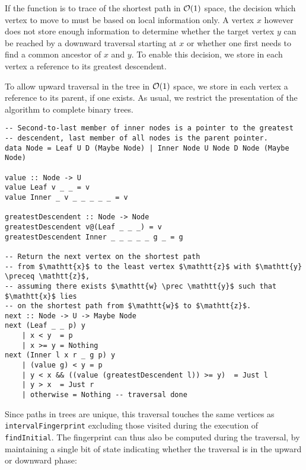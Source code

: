 If the function is to trace of the shortest path in $\mathcal{O}(1)$ space, the decision which vertex to move to must be based on local information only. A vertex $x$ however does not store enough information to determine whether the target vertex $y$ can be reached by a downward traversal starting at $x$ or whether one first needs to find a common ancestor of $x$ and $y$. To enable this decision, we store in each vertex a reference to its greatest descendent.

To allow upward traversal in the tree in $\mathcal{O}(1)$ space, we store in each vertex a reference to its parent, if one exists. As usual, we restrict the presentation of the algorithm to complete binary trees.

\begin{verbatim}
-- Second-to-last member of inner nodes is a pointer to the greatest
-- descendent, last member of all nodes is the parent pointer.
data Node = Leaf U D (Maybe Node) | Inner Node U Node D Node (Maybe Node)

value :: Node -> U
value Leaf v _ _ = v
value Inner _ v _ _ _ _ _ = v

greatestDescendent :: Node -> Node
greatestDescendent v@(Leaf _ _ _) = v
greatestDescendent Inner _ _ _ _ _ g _ = g

-- Return the next vertex on the shortest path
-- from $\mathtt{x}$ to the least vertex $\mathtt{z}$ with $\mathtt{y} \preceq \mathtt{z}$,
-- assuming there exists $\mathtt{w} \prec \mathtt{y}$ such that $\mathtt{x}$ lies
-- on the shortest path from $\mathtt{w}$ to $\mathtt{z}$.
next :: Node -> U -> Maybe Node
next (Leaf _ _ p) y
    | x < y  = p
    | x >= y = Nothing
next (Inner l x r _ g p) y
    | (value g) < y = p
    | y < x && ((value (greatestDescendent l)) >= y)  = Just l
    | y > x  = Just r
    | otherwise = Nothing -- traversal done
\end{verbatim}

Since paths in trees are unique, this traversal touches the same vertices as \texttt{intervalFingerprint} excluding those visited during the execution of \texttt{findInitial}. The fingerprint can thus also be computed during the traversal, by maintaining a single bit of state indicating whether the traversal is in the upward or downward phase:


